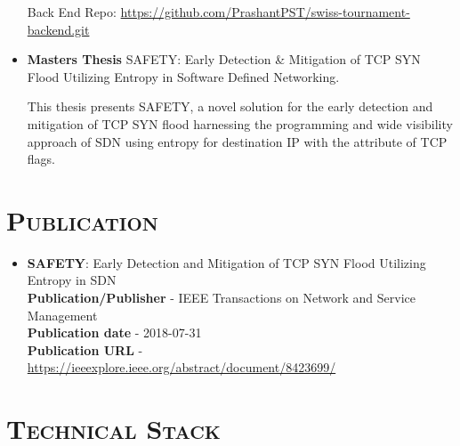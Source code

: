 \documentclass{moderncv}
\begin{document}
\begin{itemize}
\vspace{1pt}

Back End Repo: \url{https://github.com/PrashantPST/swiss-tournament-backend.git}

\vspace{3pt}


\item{\textbf{Masters Thesis} SAFETY: Early Detection \& Mitigation of TCP
SYN Flood Utilizing Entropy in Software Defined Networking.

\vspace{3pt}

\small{This thesis presents SAFETY, a novel solution for the early detection and mitigation of TCP SYN flood harnessing the programming and wide visibility approach of SDN using entropy for destination IP with the attribute of TCP flags.}}

\vspace{4pt}

\end{itemize}

\vspace{2pt}

\section{\textsc{Publication}}

\vspace{2pt}

\begin{itemize}
\item{\textbf{SAFETY}: Early Detection and Mitigation of TCP SYN Flood Utilizing Entropy in SDN}\\
\textbf{Publication/Publisher} - IEEE Transactions on Network and Service Management \\
\textbf{Publication date} - 2018-07-31 \\
\textbf{Publication URL} - \url{https://ieeexplore.ieee.org/abstract/document/8423699/}
\end{itemize}

\section{\textsc{Technical Stack}}

\vspace{2pt}
\end{document}
